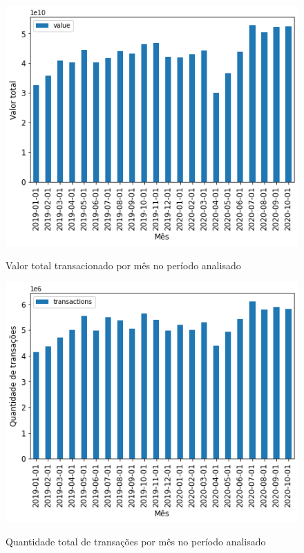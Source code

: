 
\begin{figure}[htb]
	\centering
    \caption{Valor total transacionado por mês no período analisado}
    \includegraphics[scale=0.7]{images/base-de-dados-18.1-valor-mensal-total.png}
    \label{fig:pandemia:descritiva-18.1-valor-mensal-total}
    \fautor
\end{figure}

\begin{figure}[htb]
	\centering
    \caption{Quantidade total de transações por mês no período analisado}
    \includegraphics[scale=0.7]{images/base-de-dados-18.2-transacoes-mensal-total.png}
    \label{fig:pandemia:descritiva-18.2-transacoes-total-por-regiao}
    \fautor
\end{figure}

